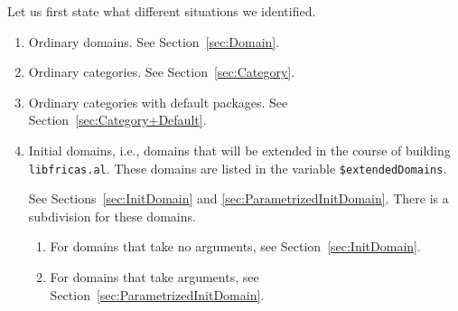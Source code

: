 \documentclass{article}
\newcommand{\file}[1]{\texttt{#1}}
\begin{document}
Let us first state what different situations we identified.
\begin{enumerate}
\item Ordinary domains. See Section~\ref{sec:Domain}.
\item Ordinary categories. See Section~\ref{sec:Category}.
\item Ordinary categories with default packages. See
  Section~\ref{sec:Category+Default}.
\item Initial domains, i.e., domains that will be extended in the
  course of building \file{libfricas.al}. These domains are listed in
  the variable \verb'$extendedDomains'. %

  See Sections~\ref{sec:InitDomain} and
  \ref{sec:ParametrizedInitDomain}. There is a subdivision for these
  domains.
  \begin{enumerate}
  \item For domains that take no arguments, see
    Section~\ref{sec:InitDomain}.
  \item For domains that take arguments, see
    Section~\ref{sec:ParametrizedInitDomain}.
  \end{enumerate}
\end{enumerate}





\end{document}
